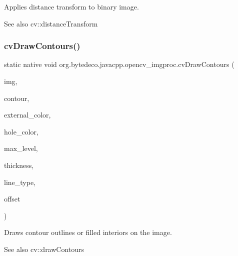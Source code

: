 Applies distance transform to binary image. 

\begin{DoxySeeAlso}{See also}
cv\+::distance\+Transform 
\end{DoxySeeAlso}
\mbox{\label{group__imgproc__c_ga225fad4fc8d41e9c4235b5b6e11de7c9}} 
\subsubsection{\texorpdfstring{cv\+Draw\+Contours()}{cvDrawContours()}}
{\footnotesize\ttfamily static native void org.\+bytedeco.\+javacpp.\+opencv\+\_\+imgproc.\+cv\+Draw\+Contours (\begin{DoxyParamCaption}\item[{Cv\+Arr}]{img,  }\item[{Cv\+Seq}]{contour,  }\item[{@By\+Val Cv\+Scalar}]{external\+\_\+color,  }\item[{@By\+Val Cv\+Scalar}]{hole\+\_\+color,  }\item[{int}]{max\+\_\+level,  }\item[{int}]{thickness,  }\item[{int}]{line\+\_\+type,  }\item[{@By\+Val(null\+Value=\char`\"{}Cv\+Point(cv\+Point(0,0))\char`\"{}) Cv\+Point}]{offset }\end{DoxyParamCaption})\hspace{0.3cm}{\ttfamily [static]}}



Draws contour outlines or filled interiors on the image. 

\begin{DoxySeeAlso}{See also}
cv\+::draw\+Contours 
\end{DoxySeeAlso}
\mbox{\label{group__imgproc__c_gadbdf06d39533d4e9a56ca2a3c6affe2c}} 
